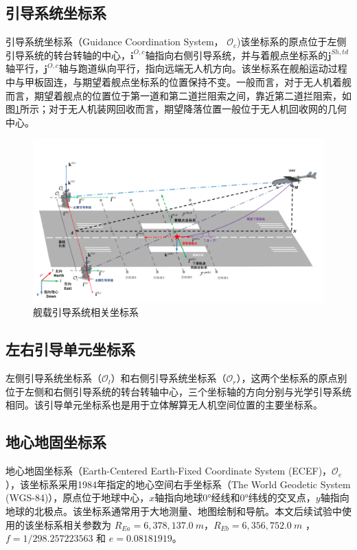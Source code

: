 \subsection{引导系统坐标系}
引导系统坐标系（Guidance Coordination System， $\mathcal{O}_c$)该坐标系的原点位于左侧引导系统的转台转轴的中心，$\mathbf{i}^{O,c}$轴指向右侧引导系统，并与着舰点坐标系的$\mathbf{j}^{Sh,td}$轴平行，$\mathbf{j}^{O,c}$轴与跑道纵向平行，指向远端无人机方向。该坐标系在舰船运动过程中与甲板固连，与期望着舰点坐标系的位置保持不变。一般而言，对于无人机着舰而言，期望着舰点的位置位于第一道和第二道拦阻索之间，靠近第二道拦阻索，如图\ref{fig:chp02_10_guidance_sys}所示；对于无人机装网回收而言，期望降落位置一般位于无人机回收网的几何中心。
\begin{figure}[htb]   
	\centering
	\includegraphics[width=\textwidth]{figs/chp02/chp02_10_guidance_sys.pdf}
	\caption{舰载引导系统相关坐标系}
	\label{fig:chp02_10_guidance_sys}
\end{figure}

\subsection{左右引导单元坐标系}
左侧引导系统坐标系（$\mathcal{O}_l$）和右侧引导系统坐标系（$\mathcal{O}_r$），这两个坐标系的原点别位于左侧和右侧引导系统的转台转轴中心，三个坐标轴的方向分别与光学引导系统相同。该引导单元坐标系也是用于立体解算无人机空间位置的主要坐标系。

\subsection{地心地固坐标系}
地心地固坐标系（Earth-Centered Earth-Fixed Coordinate System (ECEF)，$\mathcal{O}_e$），该坐标系采用1984年\cite{WGS84}指定的地心空间右手坐标系（The World Geodetic System (WGS-84)），原点位于地球中心，$x$轴指向地球0°经线和0°纬线的交叉点，$y$轴指向地球的北极点。该坐标系通常用于大地测量、地图绘制和导航。本文后续试验中使用的该坐标系相关参数为 $R_{Ea}=6,378,137.0\ m$，$R_{Eb} = 6,356,752.0\ m$ ，$f=1/298.257223563$ 和 $e=0.08181919$。

